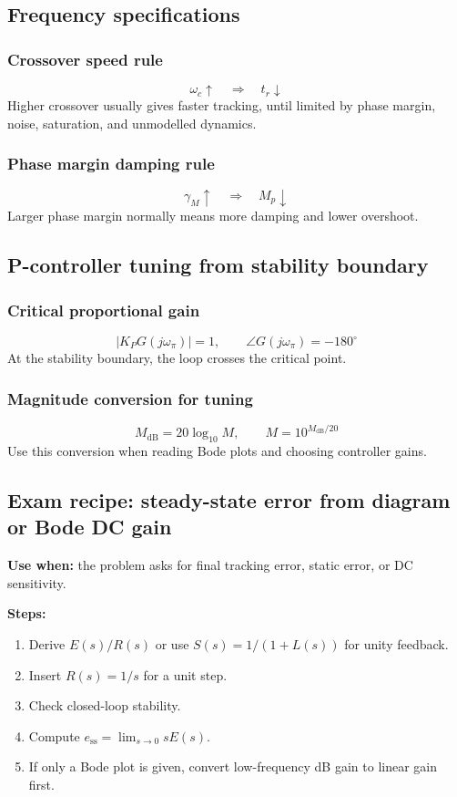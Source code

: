 \subsection{Frequency specifications}

\subsubsection{Crossover speed rule}
\[
\omega_c\uparrow\quad\Longrightarrow\quad t_r\downarrow
\]
Higher crossover usually gives faster tracking, until limited by phase margin, noise, saturation, and unmodelled dynamics.

\subsubsection{Phase margin damping rule}
\[
\gamma_M\uparrow\quad\Longrightarrow\quad M_p\downarrow
\]
Larger phase margin normally means more damping and lower overshoot.

\subsection{P-controller tuning from stability boundary}

\subsubsection{Critical proportional gain}
\[
|K_PG(j\omega_\pi)|=1,\qquad \angle G(j\omega_\pi)=-180^\circ
\]
At the stability boundary, the loop crosses the critical point.

\subsubsection{Magnitude conversion for tuning}
\[
M_{\mathrm{dB}}=20\log_{10}M,\qquad M=10^{M_{\mathrm{dB}}/20}
\]
Use this conversion when reading Bode plots and choosing controller gains.

\subsection{Exam recipe: steady-state error from diagram or Bode DC gain}

\textbf{Use when:} the problem asks for final tracking error, static error, or DC sensitivity.

\textbf{Steps:}
\begin{enumerate}
\item Derive \(E(s)/R(s)\) or use \(S(s)=1/(1+L(s))\) for unity feedback.
\item Insert \(R(s)=1/s\) for a unit step.
\item Check closed-loop stability.
\item Compute \(e_{\mathrm{ss}}=\lim_{s\to0}sE(s)\).
\item If only a Bode plot is given, convert low-frequency dB gain to linear gain first.
\end{enumerate}

